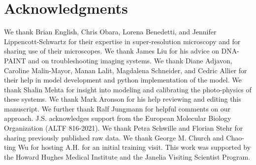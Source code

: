 \section{Acknowledgments}
We thank Brian English, Chris Obara, Lorena Benedetti, and Jennifer Lippencott-Schwartz for their expertise in
    super-resolution microscopy and for sharing use of their microscopes. 
    We thank James Liu for his advice on DNA-PAINT and on troubleshooting imaging systems.
    We thank Diane Adjavon, Caroline Malin-Mayor, Manan Lalit, Magdalena Schneider, and Cedric Allier 
    for their help in model development and python implementation of the model. 
    We thank Shalin Mehta for insight into modeling and calibrating the photo-physics of these systems.
    We thank Mark Aronson for his help reviewing and editing this manuscript. 
    We further thank Ralf Jungmann for helpful comments on our approach.
    J.S. acknowledges support from the European Molecular Biology Organization (ALTF 816-2021). 
    We thank Petra Schwille and Florian Stehr for sharing previously published raw data. 
    We thank George M. Church and Chao-ting Wu for hosting A.H. for an initial training visit.
    This work was supported by the Howard Hughes Medical Institute and the Janelia Visiting Scientist Program.
